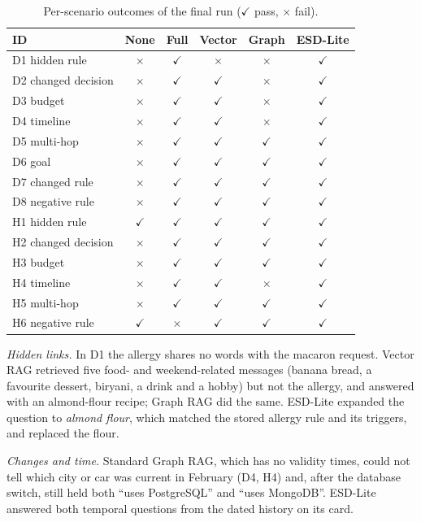 \documentclass[conference]{IEEEtran}
\newcommand{\cmark}{$\checkmark$}
\newcommand{\xmark}{$\times$}
\begin{document}
\begin{table}[t]
\caption{Per-scenario outcomes of the final run (\cmark{} pass, \xmark{} fail).}
\centering
\footnotesize
\setlength{\tabcolsep}{4pt}
\begin{tabular}{@{}lccccc@{}}
\toprule
\textbf{ID} & \textbf{None} & \textbf{Full} & \textbf{Vector} & \textbf{Graph} & \textbf{ESD-Lite} \\
\midrule
D1 hidden rule & \xmark & \cmark & \xmark & \xmark & \cmark \\
D2 changed decision & \xmark & \cmark & \cmark & \xmark & \cmark \\
D3 budget & \xmark & \cmark & \cmark & \xmark & \cmark \\
D4 timeline & \xmark & \cmark & \cmark & \xmark & \cmark \\
D5 multi-hop & \xmark & \cmark & \cmark & \cmark & \cmark \\
D6 goal & \xmark & \cmark & \cmark & \cmark & \cmark \\
D7 changed rule & \xmark & \cmark & \cmark & \cmark & \cmark \\
D8 negative rule & \xmark & \cmark & \cmark & \cmark & \cmark \\
H1 hidden rule & \cmark & \cmark & \cmark & \cmark & \cmark \\
H2 changed decision & \xmark & \cmark & \cmark & \cmark & \cmark \\
H3 budget & \xmark & \cmark & \cmark & \cmark & \cmark \\
H4 timeline & \xmark & \cmark & \cmark & \xmark & \cmark \\
H5 multi-hop & \xmark & \cmark & \cmark & \cmark & \cmark \\
H6 negative rule & \cmark & \xmark & \cmark & \cmark & \cmark \\
\bottomrule
\end{tabular}
\label{tab_grid}
\end{table}

\textit{Hidden links.} In D1 the allergy shares no words with the macaron request. Vector RAG retrieved five food- and weekend-related messages (banana bread, a favourite dessert, biryani, a drink and a hobby) but not the allergy, and answered with an almond-flour recipe; Graph RAG did the same. ESD-Lite expanded the question to \emph{almond flour}, which matched the stored allergy rule and its triggers, and replaced the flour.

\textit{Changes and time.} Standard Graph RAG, which has no validity times, could not tell which city or car was current in February (D4, H4) and, after the database switch, still held both ``uses PostgreSQL'' and ``uses MongoDB''. ESD-Lite answered both temporal questions from the dated history on its card.
\end{document}
